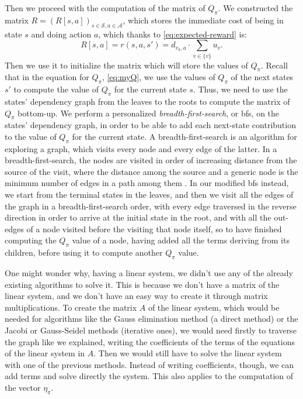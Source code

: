 Then we proceed with the computation of the matrix of $Q_\pi$. We constructed the matrix $R = (R[s,a])_{s \in \mathcal S, a \in \mathcal A}$, which stores the immediate cost of being in state $s$ and doing action $a$, which thanks to \eqref{eq:expected-reward} is:
\begin{equation}
    R[s,a] = r(s,a,s') = d_{v_k, a} \cdot \sum_{v \in \{v\}} u_v.
\end{equation}
Then we use it to initialize the matrix which will store the values of $Q_\pi$. Recall that in the equation for $Q_\pi$, \eqref{eq:myQ}, we use the values of $Q_\pi$ of the next states $s'$ to compute the value of $Q_\pi$ for the current state $s$. Thus, we need to use the states' dependency graph from the leaves to the roots to compute the matrix of $Q_\pi$ bottom-up. We perform a personalized \emph{breadth-first-search}, or \acrshort{bfs}, on the states' dependency graph, in order to be able to add each next-state contribution to the value of $Q_\pi$ for the current state. A breadth-first-search is an algorithm for exploring a graph, which visits every node and every edge of the latter. In a breadth-first-search, the nodes are visited in order of increasing distance from the source of the visit, where the distance among the source and a generic node is the minimum number of edges in a path among them \cite{Montresor2014}. In our modified \acrshort{bfs} instead, we start from the terminal states in the leaves, and then we visit all the edges of the graph in a breadth-first-search order, with every edge traversed in the reverse direction in order to arrive at the initial state in the root, and with all the out-edges of a node visited before the visiting that node itself, so to have finished computing the $Q_\pi$ value of a node, having added all the terms deriving from its children, before using it to compute another $Q_\pi$ value.

One might wonder why, having a linear system, we didn't use any of the already existing algorithms to solve it. This is because we don't have a matrix of the linear system, and we don't have an easy way to create it through matrix multiplications. To create the matrix $A$ of the linear system, which would be needed for algorithms like the Gauss elimination method (a direct method) or the Jacobi or Gauss-Seidel methods (iterative ones), we would need firstly to traverse the graph like we explained, writing the coefficients of the terms of the equations of the linear system in $A$. Then we would still have to solve the linear system with one of the previous methods. Instead of writing coefficients, though, we can add terms and solve directly the system. This also applies to the computation of the vector $\eta_\pi$.

